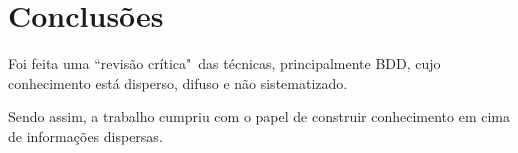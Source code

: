 \chapter{Conclusões} %
\label{cha:conclusoes}

Foi feita uma ``revisão crítica"\ das técnicas, principalmente BDD, cujo conhecimento está disperso, difuso e não sistematizado.

Sendo assim, a trabalho cumpriu com o papel de construir conhecimento em cima de informações dispersas.

